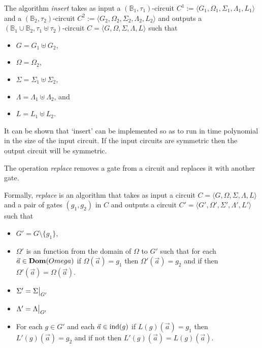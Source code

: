 \documentclass[../paper.tex]{subfiles}
\begin{document}
\begin{definition}
  The algorithm \emph{insert} takes as input a $(\mathbb{B}_1, \tau_1)$-circuit
  $C^1 := \langle G_1, \Omega_1, \Sigma_1 , \Lambda_1, L_1 \rangle$ and a
  $(\mathbb{B}_2, \tau_2)$-circuit $C^2 := \langle G_2, \Omega_2, \Sigma_2 ,
  \Lambda_2, L_2 \rangle$ and outputs a $(\mathbb{B}_1 \cup \mathbb{B}_2, \tau_1
  \uplus \tau_2)$-circuit $C = \langle G, \Omega, \Sigma , \Lambda, L \rangle$
  such that
  \begin{itemize}
    \setlength\itemsep{0mm}
  \item $G = G_1 \uplus G_2$,
  \item $\Omega = \Omega_2$,
  \item $\Sigma = \Sigma_1 \uplus \Sigma_2$,
  \item $\Lambda = \Lambda_1 \uplus \Lambda_2$, and
  \item $L = L_1 \uplus L_2$.
  \end{itemize}
\end{definition}

It can be shown that `insert' can be implemented so as to run in time polynomial
in the size of the input circuit. If the input circuits are symmetric then the
output circuit will be symmetric.

The operation \emph{replace} removes a gate from a circuit and replaces it with
another gate.
  
\begin{definition}
  Formally, \emph{replace} is an algorithm that takes as input a circuit $C =
  \langle G, \Omega, \Sigma, \Lambda, L\rangle$ and a pair of gates $(g_1, g_2)$
  in $C$ and outputs a circuit $C' = \langle G', \Omega', \Sigma', \Lambda', L'
  \rangle$ such that
  \begin{itemize}
    \setlength\itemsep{0mm}
  \item $G' = G \setminus \{g_1\}$,
  \item $\Omega'$ is an function from the domain of $\Omega$ to $G'$ such that
    for each $\vec{a} \in \text{\textbf{Dom}}(Omega)$ if $\Omega(\vec{a}) = g_1$ then
    $\Omega'(\vec{a}) = g_2$ and if then $\Omega'(\vec{a}) = \Omega(\vec{a})$.
  \item $\Sigma' = \restr{\Sigma}{G'}$
  \item $\Lambda' = \restr{\Lambda}{G'}$
  \item For each $g \in G'$ and each $\vec{a} \in \text{\upshape ind}(g)$ if $L(g)(\vec{a}) =
    g_1$ then $L'(g)(\vec{a}) = g_2$ and if not then $L'(g)(\vec{a}) =
    L(g)(\vec{a})$.
  \end{itemize}
\end{definition}
\end{document}
